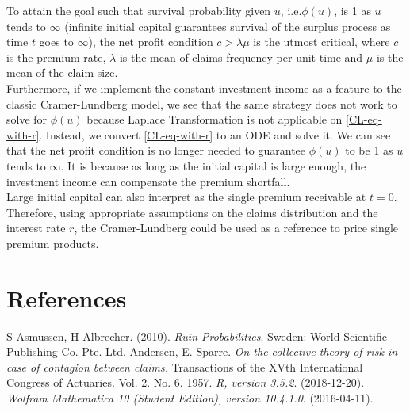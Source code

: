\documentclass[12pt]{article}
\begin{document}
To attain the goal such that survival probability given \(u\), i.e.\(\phi(u)\), is 1 as \(u\) tends to \(\infty\) (infinite initial capital guarantees survival of the surplus process as time \(t\) goes to \(\infty\)), the net profit condition \(c>\lambda\mu\) is the utmost critical, where \(c\) is the premium rate, \(\lambda\) is the mean of claims frequency per unit time and \(\mu\) is the mean of the claim size.\\

Furthermore, if we implement the constant investment income as a feature to the classic Cramer-Lundberg model, we see that the same strategy does not work to solve for \(\phi(u)\) because Laplace Transformation is not applicable on \eqref{CL-eq-with-r}. Instead, we convert \eqref{CL-eq-with-r} to an ODE and solve it. We can see that the net profit condition is no longer needed to guarantee \(\phi(u)\) to be 1 as \(u\) tends to \(\infty\). It is because as long as the initial capital is large enough, the investment income can compensate the premium shortfall.\\

Large initial capital can also interpret as the single premium receivable at \(t=0\). Therefore, using appropriate assumptions on the claims distribution and the interest rate \(r\), the Cramer-Lundberg could be used as a reference to price single premium products.



\section{References}
\begingroup
\renewcommand{\section}[2]{}%
\begin{thebibliography}{}
 S Asmussen, H Albrecher. (2010). \textit{Ruin Probabilities}. Sweden: World Scientific Publishing Co. Pte. Ltd.
 Andersen, E. Sparre. \textit{On the collective theory of risk in case of contagion between claims.} Transactions of the XVth International Congress of Actuaries. Vol. 2. No. 6. 1957.
 \textit{R, version 3.5.2}. (2018-12-20).
 \textit{Wolfram Mathematica 10 (Student Edition), version 10.4.1.0}. (2016-04-11).
\end{thebibliography}
\endgroup
\end{document}
